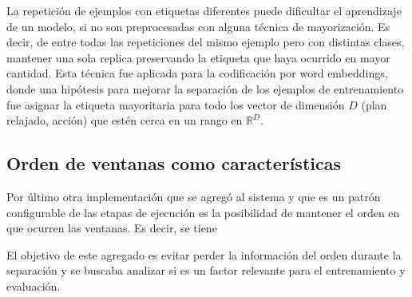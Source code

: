 La repetición de ejemplos con etiquetas diferentes puede dificultar el
aprendizaje de un modelo, si no son preprocesadas con alguna técnica de
mayorización. Es decir, de entre todas las repeticiones del mismo ejemplo pero
con distintas clases, mantener una sola replica preservando la etiqueta que haya
ocurrido en mayor cantidad. Esta técnica fue aplicada para la codificación por
word embeddings, donde una hipótesis para mejorar la separación de los ejemplos
de entrenamiento fue asignar la etiqueta mayoritaria para todo los vector de
dimensión $D$ (plan relajado, acción) que estén cerca en un rango en
$\mathbb{R}^{D}$.

\subsection{Orden de ventanas como características}

Por último otra implementación que se agregó al sistema y que es un patrón
configurable de las etapas de ejecución es la posibilidad de mantener el orden
en que ocurren las ventanas. Es decir, se tiene

\begin{table}[h!]
\centering
{}
 \caption{Ejemplos etiquetados a partir de un plan relajado y una acción}
 \label{tb:matrix_shape}
\end{table}

El objetivo de este agregado es evitar perder la información del orden durante
la separación y se buscaba analizar si es un factor relevante para el
entrenamiento y evaluación.